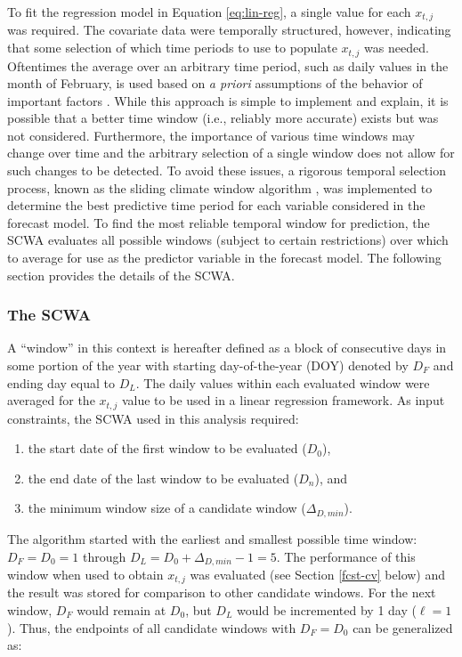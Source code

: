 \documentclass[12pt,]{book}
\providecommand{\tightlist}{%
  \setlength{\itemsep}{0pt}\setlength{\parskip}{0pt}}
\theoremstyle{definition}
\theoremstyle{definition}
\theoremstyle{definition}
\theoremstyle{remark}
\begin{document}
\noindent
To fit the regression model in Equation \eqref{eq:lin-reg}, a single value
for each \(x_{t,j}\) was required. The covariate data were temporally
structured, however, indicating that some selection of which time
periods to use to populate \(x_{t,j}\) was needed. Oftentimes the
average over an arbitrary time period, such as daily values in the month
of February, is used based on \emph{a priori} assumptions of the
behavior of important factors \citep{vandepol-etal-2016}. While this
approach is simple to implement and explain, it is possible that a
better time window (i.e., reliably more accurate) exists but was not
considered. Furthermore, the importance of various time windows may
change over time and the arbitrary selection of a single window does not
allow for such changes to be detected. To avoid these issues, a rigorous
temporal selection process, known as the sliding climate window
algorithm \citep[SCWA;][]{vandepol-etal-2016}, was implemented to
determine the best predictive time period for each variable considered
in the forecast model. To find the most reliable temporal window for
prediction, the SCWA evaluates all possible windows (subject to certain
restrictions) over which to average for use as the predictor variable in
the forecast model. The following section provides the details of the
SCWA.

\subsubsection{The SCWA}\label{the-scwa}

\noindent
A ``window'' in this context is hereafter defined as a block of
consecutive days in some portion of the year with starting
day-of-the-year (DOY) denoted by \(D_F\) and ending day equal to
\(D_L\). The daily values within each evaluated window were averaged for
the \(x_{t,j}\) value to be used in a linear regression framework. As
input constraints, the SCWA used in this analysis required:

\begin{enumerate}
\def\labelenumi{(\arabic{enumi})}
\tightlist
\item
  the start date of the first window to be evaluated (\(D_0\)),
\item
  the end date of the last window to be evaluated (\(D_n\)), and
\item
  the minimum window size of a candidate window (\(\Delta_{D,min}\)).
\end{enumerate}

\noindent
The algorithm started with the earliest and smallest possible time
window: \(D_F = D_0 = 1\) through
\(D_L = D_0 + \Delta_{D,min} - 1 = 5\). The performance of this window
when used to obtain \(x_{t,j}\) was evaluated (see Section \ref{fcst-cv}
below) and the result was stored for comparison to other candidate
windows. For the next window, \(D_F\) would remain at \(D_0\), but
\(D_L\) would be incremented by 1 day (\(\ell=1\)). Thus, the endpoints
of all candidate windows with \(D_F = D_0\) can be generalized as:
\end{document}
